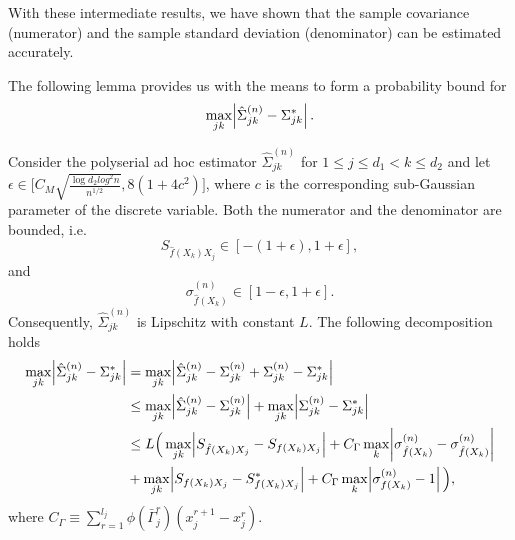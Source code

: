 With these intermediate results, we have shown that the sample covariance (numerator) and the sample standard deviation (denominator) can be estimated accurately.

The following lemma provides us with the means to form a probability bound for
\begin{equation*}
    \max_{jk}\abs{\hat{\Sigma}_{jk}^{(n)} -  \Sigma_{jk}^{*}}.
\end{equation*}


\begin{lemma}
    Consider the polyserial ad hoc estimator $\hat{\Sigma}_{jk}^{(n)}$ for $1 \leq j \leq d_1 < k \leq d_2$ and let $\epsilon \in \Big[ C_M\sqrt{\frac{\log d_2 log^2 n}{n^{1/2}}}, 8(1+4c^2)\Big]$, where $c$ is the corresponding sub-Gaussian parameter of the discrete variable.
    Both the numerator and the denominator are bounded, i.e.
    \begin{equation*}
        S_{\hat{f}(X_k)X_j} \in [-(1 + \epsilon), 1 + \epsilon],
    \end{equation*}
    and
    \begin{equation*}
        \sigma_{\hat{f}(X_k)}^{(n)} \in [1-\epsilon, 1+\epsilon].
    \end{equation*}
    Consequently, $\hat{\Sigma}_{jk}^{(n)}$ is Lipschitz with constant $L$. The following decomposition holds
    \begin{align*}
        \max_{jk}\abs{\hat{\Sigma}_{jk}^{(n)} -  \Sigma_{jk}^{*}} & =  \max_{jk}\abs{\hat{\Sigma}_{jk}^{(n)} - {\Sigma}_{jk}^{(n)} + {\Sigma}_{jk}^{(n)} - \Sigma_{jk}^{*}}                                                  \\
                                                                  & \leq \max_{jk}\abs{\hat{\Sigma}_{jk}^{(n)} - {\Sigma}_{jk}^{(n)}} + \max_{jk}\abs{{\Sigma}_{jk}^{(n)} - \Sigma_{jk}^{*}}                                 \\
                                                                  & \leq L \Big( \max_{jk} \abs{S_{\hat{f}(X_k)X_j} - S_{{f}(X_k)X_j} } + C_\Gamma \max_{k} \abs{\sigma_{\hat{f}(X_k)}^{(n)} - \sigma_{\hat{f}(X_k)}^{(n)} } \\
                                                                  & +  \max_{jk} \abs{S_{{f}(X_k)X_j} - S^*_{{f}(X_k)X_j}}  + C_\Gamma \max_{k} \abs{\sigma^{(n)}_{{f}(X_k)} - 1} \Big),
    \end{align*}
    where $C_\Gamma \equiv \sum_{r=1}^{l_{j}} \phi(\bar{\Gamma}_j^r)(x_j^{r+1} - x_j^r)$.
\end{lemma}

